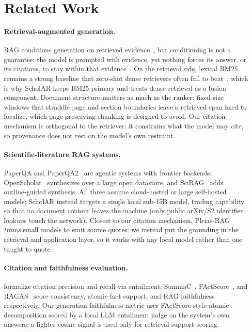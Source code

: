 \documentclass[letterpaper]{article} %
\begin{document}
\section{Related Work}
\label{sec:related}

\paragraph{Retrieval-augmented generation.}
RAG conditions generation on retrieved evidence~\citep{lewis2020rag}, but conditioning is not a
guarantee: the model is prompted with evidence, yet nothing forces its answer, or its citations, to
stay within that evidence~\citep{gao2023attributing}. On the retrieval side, lexical
BM25~\citep{robertson2009bm25} remains a strong baseline that zero-shot dense retrievers often fail
to beat~\citep{thakur2021beir}, which is why ScholAR keeps BM25 primary and treats dense retrieval
as a fusion component. Document structure matters as much as the ranker: fixed-size windows that
straddle page and section boundaries leave a retrieved span hard to localize, which page-preserving
chunking is designed to avoid. Our citation mechanism is orthogonal to the retriever: it constrains
what the model may cite, so provenance does not rest on the model's own restraint.

\paragraph{Scientific-literature RAG systems.}
PaperQA and PaperQA2~\citep{lala2023paperqa,lala2024paperqa2} are agentic systems with frontier
backends; OpenScholar~\citep{asai2024openscholar} synthesizes over a large open datastore, and
SciRAG~\citep{ding2025scirag} adds outline-guided synthesis. All three assume cloud-hosted or large
self-hosted models; ScholAR instead targets a single local sub-15B model, trading capability so
that no document content leaves the machine (only public arXiv/S2 identifier lookups touch the
network). Closest to our citation mechanism, Pleias-RAG~\citep{pleias2025rag}
\emph{trains} small models to emit source quotes; we instead put the grounding in the retrieval and
application layer, so it works with any local model rather than one taught to quote.

\paragraph{Citation and faithfulness evaluation.}
\citet{gao2023attributing} formalize citation precision and recall via entailment;
SummaC~\citep{laban2022summac}, FActScore~\citep{min2023factscore}, and RAGAS~\citep{es2024ragas}
score consistency, atomic-fact support, and RAG faithfulness respectively. Our
generation-faithfulness metric uses FActScore-style atomic decomposition scored by a local LLM
entailment judge on the system's own answers; a lighter cosine signal is used only for
retrieval-support scoring.
\end{document}

